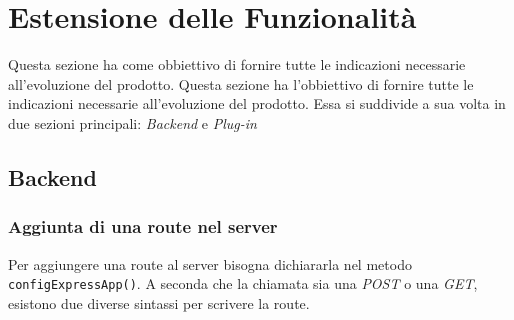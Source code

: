 \section{Estensione delle Funzionalità}\label{Estensione}
Questa sezione ha come obbiettivo di fornire tutte le indicazioni necessarie all'evoluzione del prodotto. 
Questa sezione ha l'obbiettivo di fornire tutte le indicazioni necessarie all'evoluzione del prodotto. 
Essa si suddivide a sua volta in due sezioni principali: \textit{Backend} e \textit{Plug-in}

\subsection{Backend}\label{Estensione_Server}
\subsubsection{Aggiunta di una route nel server}
Per aggiungere una route al server bisogna dichiararla nel metodo \texttt{configExpressApp()}. 
A seconda che la chiamata sia una \textit{POST} o una \textit{GET}, esistono due diverse sintassi per scrivere la route.
